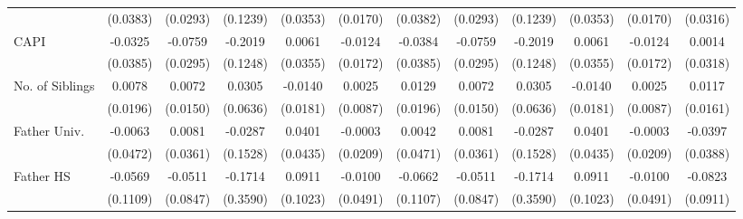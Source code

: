 \begin{table}[htbp]
\begin{tabular}{l*{11}{c}}
            &    (0.0383)         &    (0.0293)         &    (0.1239)         &    (0.0353)         &    (0.0170)         &    (0.0382)         &    (0.0293)         &    (0.1239)         &    (0.0353)         &    (0.0170)         &    (0.0316)         \\
\addlinespace
CAPI        &     -0.0325         &     -0.0759\sym{*}  &     -0.2019         &      0.0061         &     -0.0124         &     -0.0384         &     -0.0759\sym{*}  &     -0.2019         &      0.0061         &     -0.0124         &      0.0014         \\
            &    (0.0385)         &    (0.0295)         &    (0.1248)         &    (0.0355)         &    (0.0172)         &    (0.0385)         &    (0.0295)         &    (0.1248)         &    (0.0355)         &    (0.0172)         &    (0.0318)         \\
\addlinespace
No. of Siblings&      0.0078         &      0.0072         &      0.0305         &     -0.0140         &      0.0025         &      0.0129         &      0.0072         &      0.0305         &     -0.0140         &      0.0025         &      0.0117         \\
            &    (0.0196)         &    (0.0150)         &    (0.0636)         &    (0.0181)         &    (0.0087)         &    (0.0196)         &    (0.0150)         &    (0.0636)         &    (0.0181)         &    (0.0087)         &    (0.0161)         \\
\addlinespace
Father Univ.&     -0.0063         &      0.0081         &     -0.0287         &      0.0401         &     -0.0003         &      0.0042         &      0.0081         &     -0.0287         &      0.0401         &     -0.0003         &     -0.0397         \\
            &    (0.0472)         &    (0.0361)         &    (0.1528)         &    (0.0435)         &    (0.0209)         &    (0.0471)         &    (0.0361)         &    (0.1528)         &    (0.0435)         &    (0.0209)         &    (0.0388)         \\
\addlinespace
Father HS   &     -0.0569         &     -0.0511         &     -0.1714         &      0.0911         &     -0.0100         &     -0.0662         &     -0.0511         &     -0.1714         &      0.0911         &     -0.0100         &     -0.0823         \\
            &    (0.1109)         &    (0.0847)         &    (0.3590)         &    (0.1023)         &    (0.0491)         &    (0.1107)         &    (0.0847)         &    (0.3590)         &    (0.1023)         &    (0.0491)         &    (0.0911)         \\

\end{tabular}
\end{table}
